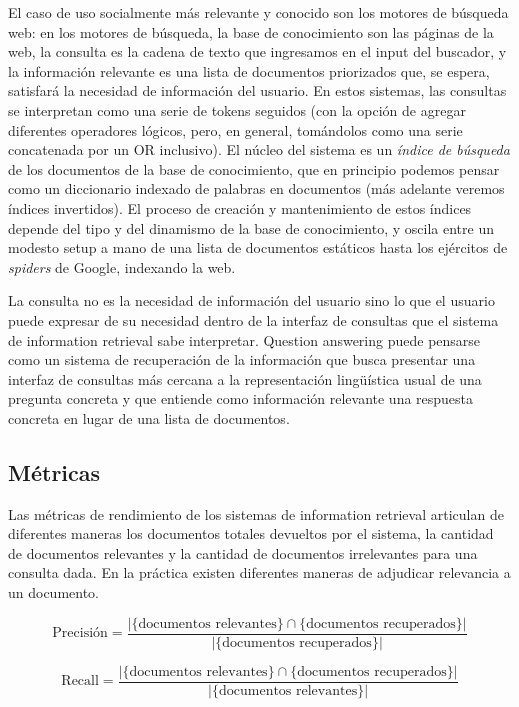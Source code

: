 El caso de uso socialmente más relevante y conocido son los motores de búsqueda web: en los motores de búsqueda, la base de conocimiento son las páginas de la web, la consulta es la cadena de texto que ingresamos en el input del buscador, y la información relevante es una lista de documentos priorizados que, se espera, satisfará la necesidad de información del usuario. En estos sistemas, las consultas se interpretan como una serie de tokens seguidos (con la opción de agregar diferentes operadores lógicos, pero, en general, tomándolos como una serie concatenada por un OR inclusivo). El núcleo del sistema es un \textit{índice de búsqueda} de los documentos de la base de conocimiento, que en principio podemos pensar como un diccionario indexado de palabras en documentos (más adelante veremos índices invertidos). El proceso de creación y mantenimiento de estos índices depende del tipo y del dinamismo de la base de conocimiento, y oscila entre un modesto setup a mano de una lista de documentos estáticos hasta los ejércitos de \textit{spiders} de Google, indexando la web.

La consulta no es la necesidad de información del usuario sino lo que el usuario puede expresar de su necesidad dentro de la interfaz de consultas que el sistema de information retrieval sabe interpretar. Question answering puede pensarse como un sistema de recuperación de la información que busca presentar una interfaz de consultas más cercana a la representación lingüística usual de una pregunta concreta y que entiende como información relevante una respuesta concreta en lugar de una lista de documentos.


\subsection{Métricas}
\label{subsec:metricas-ir}
Las métricas de rendimiento de los sistemas de information retrieval articulan de diferentes maneras los documentos totales devueltos por el sistema, la cantidad de documentos relevantes y la cantidad de documentos irrelevantes para una consulta dada. En la práctica existen diferentes maneras de adjudicar relevancia a un documento.

\begin{equation}\label{eq:precision}
 \mbox{Precisión}=\frac{|\{\mbox{documentos relevantes}\}\cap\{\mbox{documentos recuperados}\}|}{|\{\mbox{documentos recuperados}\}|}
\end{equation}

\begin{equation}\label{eq:recall}
  \mbox{Recall}=\frac{|\{\mbox{documentos relevantes}\}\cap\{\mbox{documentos recuperados}\}|}{|\{\mbox{documentos relevantes}\}|}
\end{equation}

